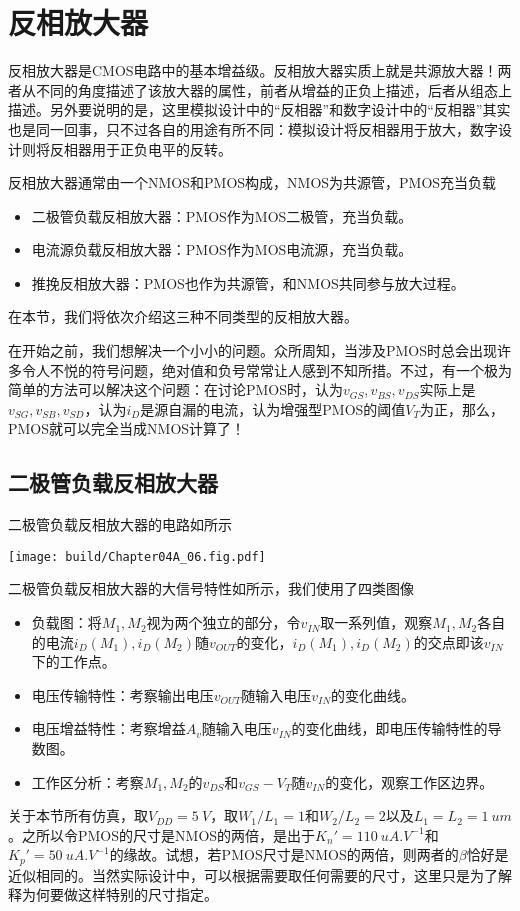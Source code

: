 \section{反相放大器}
反相放大器是CMOS电路中的基本增益级。反相放大器实质上就是共源放大器！两者从不同的角度描述了该放大器的属性，前者从增益的正负上描述，后者从组态上描述。另外要说明的是，这里模拟设计中的“反相器”和数字设计中的“反相器”其实也是同一回事，只不过各自的用途有所不同：模拟设计将反相器用于放大，数字设计则将反相器用于正负电平的反转。

反相放大器通常由一个NMOS和PMOS构成，NMOS为共源管，PMOS充当负载
\begin{itemize}
    \item 二极管负载反相放大器：PMOS作为MOS二极管，充当负载。
    \item 电流源负载反相放大器：PMOS作为MOS电流源，充当负载。
    \item 推挽反相放大器：PMOS也作为共源管，和NMOS共同参与放大过程。 
\end{itemize}

在本节，我们将依次介绍这三种不同类型的反相放大器。

在开始之前，我们想解决一个小小的问题。众所周知，当涉及PMOS时总会出现许多令人不悦的符号问题，绝对值和负号常常让人感到不知所措。不过，有一个极为简单的方法可以解决这个问题：在讨论PMOS时，认为$v_{GS},v_{BS},v_{DS}$实际上是$v_{SG},v_{SB},v_{SD}$，认为$i_D$是源自漏的电流，认为增强型PMOS的阈值$V_T$为正，那么，PMOS就可以完全当成NMOS计算了！

\subsection{二极管负载反相放大器}
二极管负载反相放大器的电路如所示
\begin{Figure}[二极管负载反相放大器]
    \texttt{[image: build/Chapter04A\_06.fig.pdf]}
\end{Figure}
二极管负载反相放大器的大信号特性如所示，我们使用了四类图像
\begin{itemize}
    \item 负载图：将$M_1,M_2$视为两个独立的部分，令$v_{IN}$取一系列值，观察$M_1,M_2$各自的电流$i_D(M_1),i_D(M_2)$随$v_{OUT}$的变化，$i_D(M_1),i_D(M_2)$的交点即该$v_{IN}$下的工作点。
    \item 电压传输特性：考察输出电压$v_{OUT}$随输入电压$v_{IN}$的变化曲线。
    \item 电压增益特性：考察增益$A_v$随输入电压$v_{IN}$的变化曲线，即电压传输特性的导数图。
    \item 工作区分析：考察$M_1,M_2$的$v_{DS}$和$v_{GS}-V_T$随$v_{IN}$的变化，观察工作区边界。
\end{itemize} 
关于本节所有仿真，取$V_{DD}=\SI{5}{V}$，取$W_1/L_1=1$和$W_2/L_2=2$以及$L_1=L_2=\SI{1}{um}$。之所以令PMOS的尺寸是NMOS的两倍，是出于$K_n'=\SI{110}{uA.V^{-1}}$和$K_p'=\SI{50}{uA.V^{-1}}$的缘故。试想，若PMOS尺寸是NMOS的两倍，则两者的$\beta$恰好是近似相同的。当然实际设计中，可以根据需要取任何需要的尺寸，这里只是为了解释为何要做这样特别的尺寸指定。


